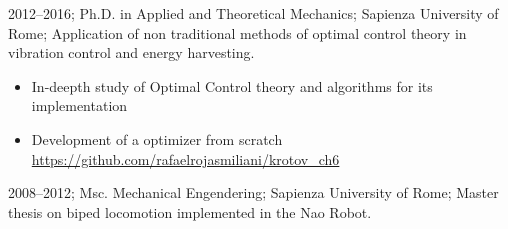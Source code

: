 \addstudy%
{%
    2012--2016;%
    Ph.D. in Applied and Theoretical Mechanics;%
    Sapienza University of Rome;%
    Application of non traditional methods of optimal control theory in vibration control and energy harvesting.%
    \begin{itemize}
        \item In-deepth study of Optimal Control theory and algorithms for its implementation
        \item Development of a optimizer from scratch \href{https://github.com/rafaelrojasmiliani/krotov_ch6}{https://github.com/rafaelrojasmiliani/krotov\_ch6}
    \end{itemize}
}%

\addstudy%
{%
    2008--2012;%
    Msc. Mechanical Engendering;%
    Sapienza University of Rome;%
    Master thesis on biped locomotion implemented in the Nao Robot.%
}%
